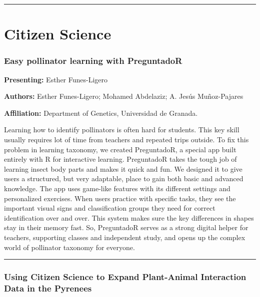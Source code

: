 \documentclass[
  letterpaper,
  DIV=11,
  numbers=noendperiod]{scrartcl}
\begin{document}
\begin{center}\rule{0.5\linewidth}{0.5pt}\end{center}

\section{Citizen Science}\label{citizen-science}

\subsubsection{Easy pollinator learning with
PreguntadoR}\label{easy-pollinator-learning-with-preguntador}

\textbf{Presenting:} Esther Funes-Ligero

\textbf{Authors:} Esther Funes-Ligero; Mohamed Abdelaziz; A. Jesús
Muñoz-Pajares

\textbf{Affiliation:} Department of Genetics, Universidad de Granada.

Learning how to identify pollinators is often hard for students. This
key skill usually requires lot of time from teachers and repeated trips
outside. To fix this problem in learning taxonomy, we created
PreguntadoR, a special app built entirely with R for interactive
learning. PreguntadoR takes the tough job of learning insect body parts
and makes it quick and fun. We designed it to give users a structured,
but very adaptable, place to gain both basic and advanced knowledge. The
app uses game-like features with its different settings and personalized
exercises. When users practice with specific tasks, they see the
important visual signs and classification groups they need for correct
identification over and over. This system makes sure the key differences
in shapes stay in their memory fast. So, PreguntadoR serves as a strong
digital helper for teachers, supporting classes and independent study,
and opens up the complex world of pollinator taxonomy for everyone.

\begin{center}\rule{0.5\linewidth}{0.5pt}\end{center}

\subsubsection{Using Citizen Science to Expand Plant-Animal Interaction
Data in the
Pyrenees}\label{using-citizen-science-to-expand-plant-animal-interaction-data-in-the-pyrenees}
\end{document}

